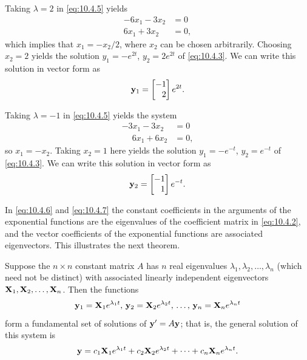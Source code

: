 Taking $\lambda=2$ in  \eqref{eq:10.4.5} yields
\begin{align*}
-6 x_1-3 x_2&=0\\
6 x_1+3 x_2&=0,
\end{align*}
which implies that $x_1=-x_2/2$, where  $x_2$ can be
chosen arbitrarily. Choosing
$x_2=2$ yields the solution $y_1=-e^{2t}$,
$y_2=2e^{2t}$ of  \eqref{eq:10.4.3}. We can write this solution in vector
form as
\begin{equation}\label{eq:10.4.6}
\mathbf{y}_1=\begin{bmatrix}-1\\\phantom{-}2\end{bmatrix} e^{2t}.
\end{equation}

Taking $\lambda=-1$ in  \eqref{eq:10.4.5} yields the system
\begin{align*}
-3 x_1-3 x_2&=0\\
\phantom{-}6 x_1+6 x_2&=0,
\end{align*}
so $x_1=-x_2$. Taking $x_2=1$ here
yields the solution $y_1=-e^{-t}$, $y_2=e^{-t}$ of  \eqref{eq:10.4.3}. We
can write this solution in vector form as
\begin{equation}\label{eq:10.4.7}
\mathbf{y}_2=\begin{bmatrix}-1\\\phantom{-}1\end{bmatrix}e^{-t}.
\end{equation}

In \eqref{eq:10.4.6} and \eqref{eq:10.4.7} the constant coefficients in the
arguments of the exponential functions are the eigenvalues of the
coefficient matrix in \eqref{eq:10.4.2}, and the vector coefficients of the
exponential functions are associated eigenvectors. This illustrates
the next theorem.

\begin{theorem}\label{thmtype:10.4.1}
 Suppose the $n\times n$
constant matrix $A$ has $n$ real eigenvalues
$\lambda_1,\lambda_2,\ldots,\lambda_n$
(which need not be distinct) with associated
linearly independent eigenvectors $\mathbf{X}_1,\mathbf{X}_2,\ldots,\mathbf{X}_n$.
Then the functions
\[
\mathbf{y}_1=\mathbf{X}_1e^{\lambda_1 t},\,
 \mathbf{y}_2=\mathbf{X}_2e^{\lambda_2 t},\,
\dots,\,
\mathbf{y}_n=\mathbf{X}_ne^{\lambda_n t}
\]
 form a fundamental set of solutions of  $\mathbf{y}'=A\mathbf{y}$;
that is, the general solution of this system is
\[
\mathbf{y}=c_1\mathbf{X}_1e^{\lambda_1 t}+c_2\mathbf{X}_2e^{\lambda_2 t}
+\cdots+c_n\mathbf{X}_ne^{\lambda_n t}.
\]
\end{theorem}

